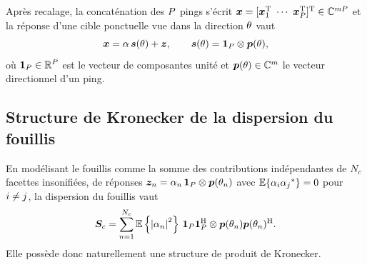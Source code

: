 \begin{definition}
\label{def:detection-fls-modele}
  Après recalage, la concaténation des $P$ pings s'écrit $\x = [\x_1^\T\ \cdots\ \x_{\Nping}^\T]^\T\in\C^{\Nsensor\Nping}$ et la réponse d'une cible ponctuelle vue dans la direction $\theta$ vaut
  \begin{equation}
    \boldsymbol{x} = \alpha\,\boldsymbol{s}(\theta) + \boldsymbol{z},
    \qquad
    \boldsymbol{s}(\theta) = \boldsymbol{1}_{P}\otimes\boldsymbol{p}(\theta),
    \label{eq:detection-fls-modele}
  \end{equation}
  où $\boldsymbol{1}_{P}\in\mathbb{R}^{P}$ est le vecteur de composantes unité et $\boldsymbol{p}(\theta)\in\mathbb{C}^{m}$ le vecteur directionnel d'un ping.
\end{definition}


\subsection{Structure de Kronecker de la dispersion du fouillis}
\label{subsec:detection-fls-kronecker}

\begin{proposition}
\label{prop:detection-fls-kronecker}
  En modélisant le fouillis comme la somme des contributions indépendantes de $N_c$ facettes insonifiées, de réponses $\boldsymbol{z}_n = \alpha_n\,\boldsymbol{1}_{P}\otimes\boldsymbol{p}(\theta_n)$ avec $\operatorname{\mathbb{E}}\{\alpha_i{\alpha_j}^{*}\}=0$ pour $i\neq j$, la dispersion du fouillis vaut
  \begin{equation}
    \boldsymbol{S}_c
    =
    \sum_{n=1}^{N_c}\operatorname{\mathbb{E}}\left\{\left\lvert\alpha_n\right\rvert^2\right\}\,
    \boldsymbol{1}_{P}\boldsymbol{1}_{P}^{\mathrm{H}}
    \otimes
    \boldsymbol{p}(\theta_n)\boldsymbol{p}(\theta_n)^{\mathrm{H}}.
    \label{eq:detection-fls-kronecker}
  \end{equation}
  Elle possède donc naturellement une structure de produit de Kronecker.
\end{proposition}


